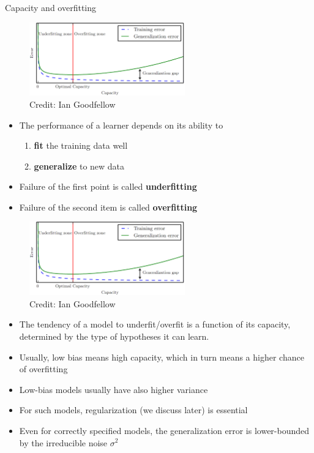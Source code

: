 \documentclass[11pt,compress,t,notes=noshow, xcolor=table]{beamer}
\begin{document}
\begin{vbframe}{Capacity and overfitting}

  \begin{figure}
    \centering
    \includegraphics[width = 0.6\textwidth]{figure_man/lcurve_1.png}
    \tiny{\\ Credit: Ian Goodfellow}
  \end{figure}
  

\begin{itemize}
  \item 
    The performance of a learner depends on its ability to 
    \begin{enumerate}
      \item \textbf{fit} the training data well
      \item \textbf{generalize} to new data
    \end{enumerate}  
  \item Failure of the first point is called \textbf{underfitting}
  \item Failure of the second item is called \textbf{overfitting}
\end{itemize}  


\framebreak

\begin{figure}
  \centering
  \includegraphics[width = 0.6\textwidth]{figure_man/lcurve_1.png}
  \tiny{\\ Credit: Ian Goodfellow}
\end{figure}


\begin{itemize}
  \item The tendency of a model to underfit/overfit is a function of its capacity, determined by the type of hypotheses it can learn.
  \item Usually, low bias means high capacity, which in turn means a higher chance of overfitting
  \item Low-bias models usually have 
  also higher variance
  \item For such models, regularization (we discuss later) is essential
  \item Even for correctly specified models, the generalization error is lower-bounded by the irreducible noise $\sigma^2$
\end{itemize}
\end{vbframe}
\end{document}
